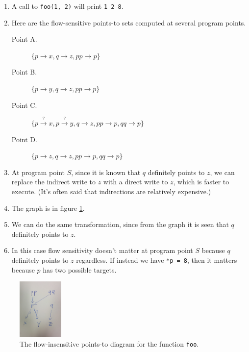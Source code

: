 \documentclass[letterpaper,11pt]{article}
\newcommand{\codesnip}{\texttt}
\newcommand{\mayp}{\xrightarrow{\text{?}}}
\newcommand{\defp}{\rightarrow}
\begin{document}
\begin{enumerate}
  \item A call to \codesnip{foo(1, 2)} will print \codesnip{1 2 8}.

  \item Here are the flow-sensitive points-to sets computed at several program
    points.

    \begin{description}
      \item[Point A.] $\{ p \defp x, q \defp z, pp \defp p \}$
      \item[Point B.] $\{ p \defp y, q \defp z, pp \defp p \}$
      \item[Point C.]
        $\{ p \mayp x, p \mayp y, q \defp z, pp \defp p, qq \defp p \}$
      \item[Point D.]
        $\{ p \defp z, q \defp z, pp \defp p, qq \defp p \}$
    \end{description}

  \item At program point $S$, since it is known that $q$ definitely points to
    $z$, we can replace the indirect write to $z$ with a direct write to $z$,
    which is faster to execute. (It's often said that indirections are
    relatively expensive.)

  \item The graph is in figure \ref{fig:points-to}.

  \item We can do the same transformation, since from the graph it is seen that
    $q$ definitely points to $z$.

  \item In this case flow sensitivity doesn't matter at program point $S$
    because $q$ definitely points to $z$ regardless. If instead we have
    \codesnip{*p = 8}, then it matters because $p$ has two possible targets.
\end{enumerate}

\begin{figure}
  \centering
  \includegraphics[width=0.2\textwidth]{diagram.jpg}
  \caption{
    The flow-insensitive points-to diagram for the function \codesnip{foo}.
  }
  \label{fig:points-to}
\end{figure}
\end{document}

